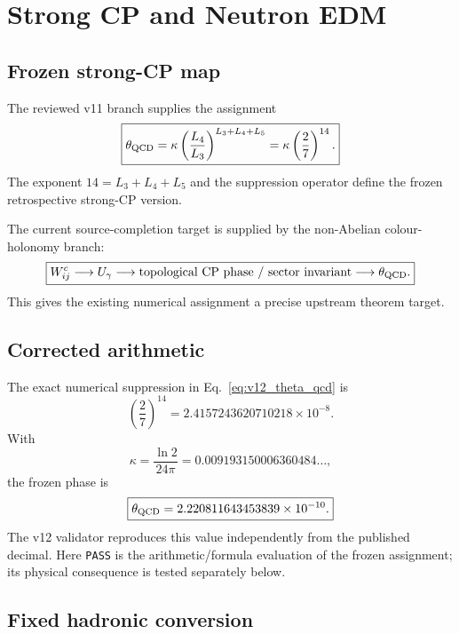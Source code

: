 \chapter{Strong CP and Neutron EDM}
\label{ch:v12_strong_cp_edm}

\section{Frozen strong-CP map}

The reviewed v11 branch supplies the assignment
\begin{equation}
\boxed{
\theta_{\rm QCD}
=\kappa\left(\frac{L_4}{L_3}\right)^{L_3+L_4+L_5}
=\kappa\left(\frac27\right)^{14}.
}
\label{eq:v12_theta_qcd}
\end{equation}
The exponent $14=L_3+L_4+L_5$ and the suppression operator define the frozen retrospective strong-CP version.

The current source-completion target is supplied by the non-Abelian colour-holonomy branch:
\begin{equation}
\boxed{
W_{ij}^{c}
\longrightarrow
U_\gamma
\longrightarrow
\text{topological CP phase / sector invariant}
\longrightarrow
\theta_{\rm QCD}.
}
\label{eq:v12_strongcp_source_axis}
\end{equation}
This gives the existing numerical assignment a precise upstream theorem target.

\section{Corrected arithmetic}

The exact numerical suppression in Eq.~\eqref{eq:v12_theta_qcd} is
\begin{equation}
\left(\frac27\right)^{14}
=2.4157243620710218\times10^{-8}.
\end{equation}
With
\[
\kappa=\frac{\ln2}{24\pi}=0.009193150006360484\ldots,
\]
the frozen phase is
\begin{equation}
\boxed{
\theta_{\rm QCD}
=2.220811643453839\times10^{-10}.
}
\label{eq:v12_theta_qcd_numeric}
\end{equation}
The v12 validator reproduces this value independently from the published decimal.
Here \texttt{PASS} is the arithmetic/formula evaluation of the frozen assignment; its physical consequence is tested separately below.

\section{Fixed hadronic conversion}

